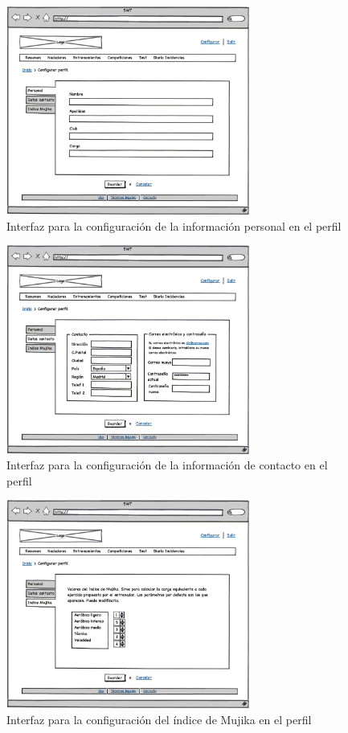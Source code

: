 		\begin{figure}[H]
		  \centering
		    \includegraphics[width=8cm]{./eps/7_Conf_personal.eps}
		  \caption{Interfaz para la configuración de la información personal en el perfil}
		  \label{fig:interfaz_conf_personal}
		\end{figure}
		
		\begin{figure}[H]
		  \centering
		    \includegraphics[width=8cm]{./eps/8_Conf_contacto.eps}
		  \caption{Interfaz para la configuración de la información de contacto en el perfil}
		  \label{fig:interfaz_conf_contacto}
		\end{figure}
		
		\begin{figure}[H]
		  \centering
		    \includegraphics[width=8cm]{./eps/9_Conf_mujika.eps}
		  \caption{Interfaz para la configuración del índice de Mujika en el perfil}
		  \label{fig:interfaz_conf_mujika}
		\end{figure}
		
